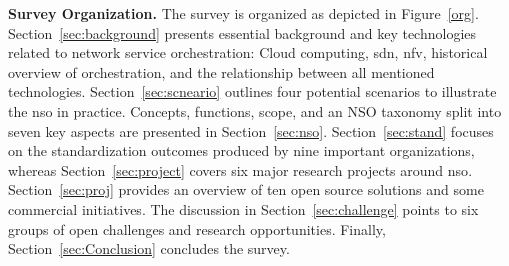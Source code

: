 \noindent \textbf{Survey Organization.}  The survey is organized as depicted in Figure~\ref{org}. Section~\ref{sec:background} presents essential background and key technologies related to network service orchestration: Cloud computing, \gls{sdn}, \gls{nfv}, historical overview of orchestration, and the relationship between all mentioned technologies. Section~\ref{sec:scneario} outlines four potential scenarios to illustrate the \gls{nso} in practice. Concepts, functions, scope, and an NSO taxonomy split into seven key aspects are presented in Section~\ref{sec:nso}. Section~\ref{sec:stand} focuses on the standardization outcomes produced by nine important organizations,   whereas Section~\ref{sec:project} covers six major research projects around \gls{nso}. Section~\ref{sec:proj} provides an overview of ten open source solutions and some commercial initiatives.  The discussion in Section~\ref{sec:challenge} points to six groups of open challenges and research opportunities. Finally, Section~\ref{sec:Conclusion} concludes the survey.